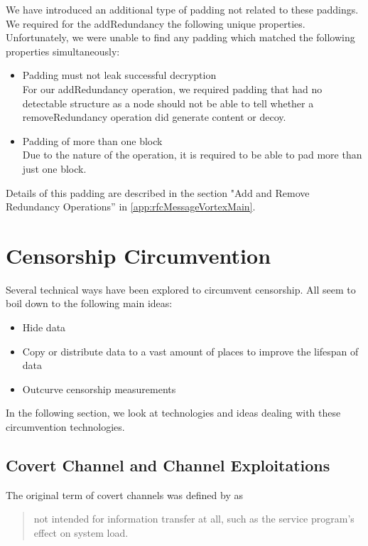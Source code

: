 We have introduced an additional type of padding not related to these paddings. We required for the addRedundancy the following unique properties. Unfortunately, we were unable to find any padding which matched the following properties simultaneously:

\begin{itemize}
	\item Padding must not leak successful decryption\\
	For our addRedundancy operation, we required padding that had no detectable structure as a node should not be able to tell whether a removeRedundancy operation did generate content or decoy. 
	\item Padding of more than one block\\
	Due to the nature of the operation, it is required to be able to pad more than just one block.
\end{itemize}

Details of this padding are described in the section "Add and Remove Redundancy Operations'' in \ref{app:rfcMessageVortexMain}. 

\chapter{Censorship Circumvention}
Several technical ways have been explored to circumvent censorship. All seem to boil down to the following main ideas:
\begin{itemize}
	\item Hide data
	\item Copy or distribute data to a vast amount of places to improve the lifespan of data
	\item Outcurve censorship measurements
\end{itemize}

In the following section, we look at technologies and ideas dealing with these circumvention technologies.

\section{Covert Channel and Channel Exploitations}
The original term of covert channels was defined by \citeauthor{Lampson73anote}\cite{Lampson73anote} as 

\begin{quote}
	not intended for information transfer at all, such as the service program's effect on system load.
\end{quote}

